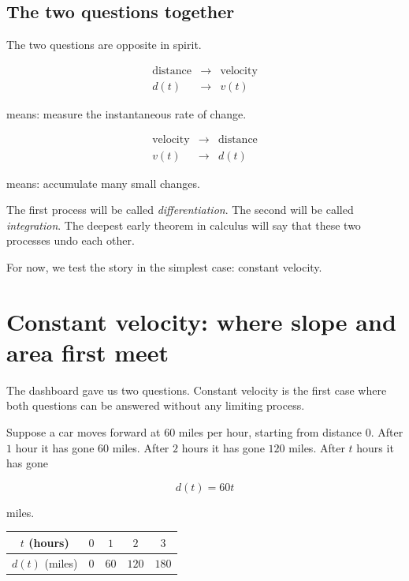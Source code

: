 \subsection{The two questions together}

The two questions are opposite in spirit.

\[
\begin{array}{ccl}
\text{distance} & \longrightarrow & \text{velocity} \\
d(t) & \longrightarrow & v(t)
\end{array}
\]

means: measure the instantaneous rate of change.

\[
\begin{array}{ccl}
\text{velocity} & \longrightarrow & \text{distance} \\
v(t) & \longrightarrow & d(t)
\end{array}
\]

means: accumulate many small changes.

The first process will be called \emph{differentiation}. The second will be called \emph{integration}. The deepest early theorem in calculus will say that these two processes undo each other.

For now, we test the story in the simplest case: constant velocity.

\section{Constant velocity: where slope and area first meet}
\label{sec:constant-velocity}

The dashboard gave us two questions. Constant velocity is the first case where both questions can be answered without any limiting process.

Suppose a car moves forward at \(60\) miles per hour, starting from distance \(0\). After \(1\) hour it has gone \(60\) miles. After \(2\) hours it has gone \(120\) miles. After \(t\) hours it has gone

\[
d(t)=60t
\]

miles.

\begin{center}
\begin{tabular}{c|cccc}
\(t\) (hours) & \(0\) & \(1\) & \(2\) & \(3\) \\ \hline
\(d(t)\) (miles) & \(0\) & \(60\) & \(120\) & \(180\)
\end{tabular}
\end{center}

